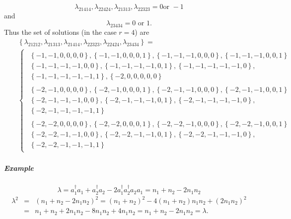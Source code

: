 \documentclass[12pt]{article}
\begin{document}
\begin{equation*}
\lambda _{21414},\lambda _{22424},\lambda _{21313},\lambda _{22323}=0\text{
or }-1
\end{equation*}%
and 
\begin{equation*}
\lambda _{23434}=0\text{ or }1.
\end{equation*}%
Thus the set of solutions (in the case $r=4$) are 
\begin{eqnarray*}
&&\left\{ \lambda _{21212},\lambda _{21313},\lambda _{21414},\lambda
_{22323},\lambda _{22424},\lambda _{23434}\right\} = \\
&&\left\{ 
\begin{array}{c}
\begin{array}{c}
\left\{ -1,-1,0,0,0,0\right\} ,\left\{ -1,-1,0,0,0,1\right\} ,\left\{
-1,-1,-1,0,0,0\right\} ,\left\{ -1,-1,-1,0,0,1\right\} \\ 
\left\{ -1,-1,-1,-1,0,0\right\} ,\left\{ -1,-1,-1,-1,0,1\right\} ,\left\{
-1,-1,-1,-1,-1,0\right\} , \\ 
\left\{ -1,-1,-1,-1,-1,1\right\} ,\left\{ -2,0,0,0,0,0\right\}%
\end{array}
\\ 
\begin{array}{c}
\left\{ -2,-1,0,0,0,0\right\} ,\left\{ -2,-1,0,0,0,1\right\} ,\left\{
-2,-1,-1,0,0,0\right\} ,\left\{ -2,-1,-1,0,0,1\right\} \\ 
\left\{ -2,-1,-1,-1,0,0\right\} ,\left\{ -2,-1,-1,-1,0,1\right\} ,\left\{
-2,-1,-1,-1,-1,0\right\} , \\ 
\left\{ -2,-1,-1,-1,-1,1\right\}%
\end{array}
\\ 
\begin{array}{c}
\left\{ -2,-2,0,0,0,0\right\} ,\left\{ -2,-2,0,0,0,1\right\} ,\left\{
-2,-2,-1,0,0,0\right\} ,\left\{ -2,-2,-1,0,0,1\right\} \\ 
\left\{ -2,-2,-1,-1,0,0\right\} ,\left\{ -2,-2,-1,-1,0,1\right\} ,\left\{
-2,-2,-1,-1,-1,0\right\} , \\ 
\left\{ -2,-2,-1,-1,-1,1\right\}%
\end{array}%
\end{array}%
\right.
\end{eqnarray*}

\subparagraph{Example}

\begin{equation*}
\lambda =a_{1}^{\dagger }a_{1}+a_{2}^{\dagger }a_{2}-2a_{1}^{\dagger
}a_{2}^{\dagger }a_{2}a_{1}=n_{1}+n_{2}-2n_{1}n_{2}
\end{equation*}%
\begin{eqnarray*}
\lambda ^{2} &=&\left( n_{1}+n_{2}-2n_{1}n_{2}\right) ^{2}=\left(
n_{1}+n_{2}\right) ^{2}-4\left( n_{1}+n_{2}\right) n_{1}n_{2}+\left(
2n_{1}n_{2}\right) ^{2} \\
&=&n_{1}+n_{2}+2n_{1}n_{2}-8n_{1}n_{2}+4n_{1}n_{2}=n_{1}+n_{2}-2n_{1}n_{2}=%
\lambda .
\end{eqnarray*}
\end{document}
